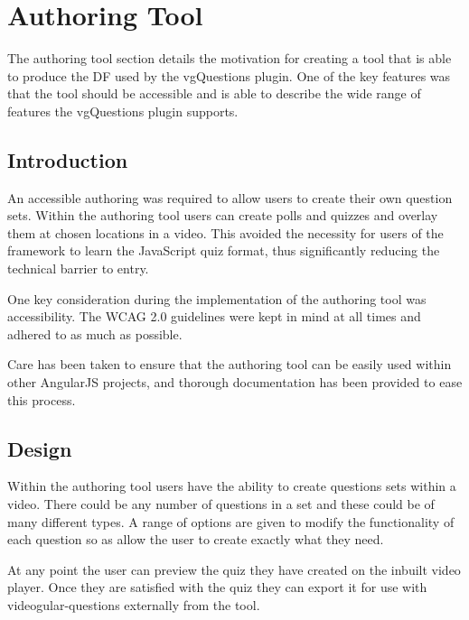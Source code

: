 \chapter{Authoring Tool} 
\label{Chapter:Authoring Tool}

\begin{preamble}
The authoring tool section details the motivation for creating a tool that is able to produce the \gls{DF} used by the \gls{vgQuestions} plugin. One of the key features was that the tool should be accessible and is able to describe the wide range of features the \gls{vgQuestions} plugin supports.
\end{preamble}

\section{Introduction}
\label{Section:Authoring_Introduction}

An accessible \gls{authoring} was required to allow users to create their own question sets. Within the authoring tool users can create polls and quizzes and overlay them at chosen locations in a video. This avoided the necessity for users of the framework to learn the JavaScript quiz format, thus significantly reducing the technical barrier to entry. 

One key consideration during the implementation of the authoring tool was accessibility. The \gls{WCAG} 2.0 guidelines were kept in mind at all times and adhered to as much as possible.

Care has been taken to ensure that the authoring tool can be easily used within other AngularJS projects, and thorough documentation has been provided to ease this process.

\section{Design} 
\label{Section:Authoring_Design}

Within the authoring tool users have the ability to create questions sets within a video. There could be any number of questions in a set and these could be of many different types. A range of options are given to modify the functionality of each question so as allow the user to create exactly what they need.

At any point the user can preview the quiz they have created on the inbuilt video player. Once they are satisfied with the quiz they can export it for use with videogular-questions externally from the tool.

